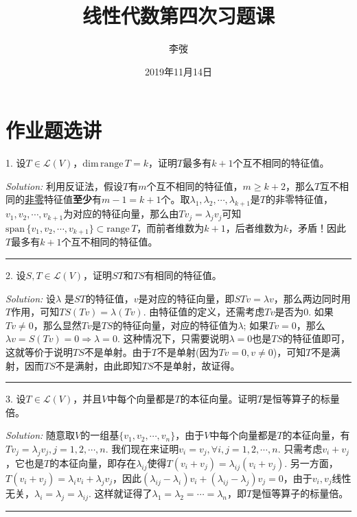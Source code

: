 \documentclass[a4[paper]{article}
\title{\bf 线性代数第四次习题课}
\author{李弢}
\date{2019年11月14日}
\def\dim{\mathrm{dim}\,}
\def\range{\mathrm{range}\,}
\def\span{\mathrm{span}\,}
\def\sep{\bigskip
\noindent{}\rule{\textwidth}{0.1mm}
\bigskip}
\begin{document}
\maketitle
\section{作业题选讲}
\noindent{} 1. 设$T\in\mathcal{L}(V)$，$\dim\range T=k$，证明$T$最多有$k+1$个互不相同的特征值。

\smallskip

\noindent{}\emph{Solution:} 利用反证法，假设$T$有$m$个互不相同的特征值，$m\ge k+2$，那么$T$互不相同的\underline{非零}特征值{\bf 至少}有$m-1=k+1$个。取$\lambda_1,\lambda_2,\cdots,\lambda_{k+1}$是$T$的非零特征值，$v_1,v_2,\cdots,v_{k+1}$为对应的特征向量，那么由$Tv_j =\lambda_j v_j$可知$\span\{v_1,v_2,\cdots,v_{k+1}\} \subset\range T$，而前者维数为$k+1$，后者维数为$k$，矛盾！因此$T$最多有$k+1$个互不相同的特征值。

\sep

\noindent{}2. 设$S,T\in\mathcal{L}(V)$，证明$ST$和$TS$有相同的特征值。

\smallskip

\noindent{}\emph{Solution:} 设$\lambda$ 是$ST$的特征值，$v$是对应的特征向量，即$STv = \lambda v$，那么两边同时用$T$作用，可知$TS(Tv) = \lambda (Tv)$. 由特征值的定义，还需考虑$Tv$是否为0. 如果$Tv\ne 0$，那么显然$Tv$是$TS$的特征向量，对应的特征值为$\lambda$; 如果$Tv=0$，那么$\lambda v= S(Tv)=0\Rightarrow \lambda=0$. 这种情况下，只需要说明$\lambda=0$也是$TS$的特征值即可，这就等价于说明$TS$不是单射。由于$T$不是单射(因为$Tv=0,v\ne0$)，可知$T$不是满射，因而$TS$不是满射，由此即知$TS$不是单射，故证得。

\sep

\noindent{}3. 设$T\in\mathcal{L}(V)$，并且$V$中每个向量都是$T$的本征向量。证明$T$是恒等算子的标量倍。

\smallskip

\noindent{}\emph{Solution:} 随意取$V$的一组基$\{v_1,v_2,\cdots,v_n\}$，由于$V$中每个向量都是$T$的本征向量，有$Tv_j = \lambda_j v_j, j= 1,2,\cdots,n$. 我们现在来证明$v_i=v_j, \forall i,j=1,2,\cdots,n$. 只需考虑$v_i+v_j$，它也是$T$的本征向量，即存在$\lambda_{ij}$使得$T(v_i+v_j) = \lambda_{ij}(v_i+v_j)$. 另一方面，$T(v_i+v_j) = \lambda_i v_i +\lambda_j v_j$，因此$(\lambda_{ij}-\lambda_i) v_i +(\lambda_{ij}-\lambda_j)v_j=0$，由于$v_i,v_j$线性无关，$\lambda_i=\lambda_j=\lambda_{ij}$. 这样就证得了$\lambda_1=\lambda_2=\cdots=\lambda_n$，即$T$是恒等算子的标量倍。

\sep
\end{document}

